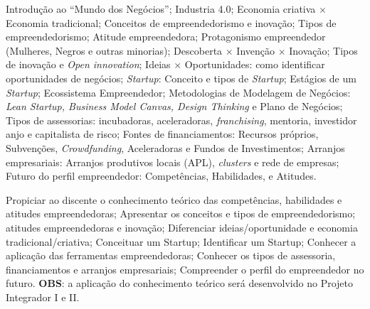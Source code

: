 \begin{pud}
	
	
	\ementa
	Introdução ao ``Mundo dos Negócios''; Industria 4.0; Economia criativa $\times$ Economia tradicional; Conceitos de empreendedorismo e inovação; Tipos de empreendedorismo; Atitude empreendedora; Protagonismo empreendedor (Mulheres, Negros e outras minorias); Descoberta $\times$ Invenção $\times$ Inovação; Tipos de inovação e \textit{Open innovation}; Ideias $\times$ Oportunidades: como identificar oportunidades de negócios; \textit{Startup}: Conceito e tipos de \textit{Startup}; Estágios de um \textit{Startup}; Ecossistema Empreendedor; Metodologias de Modelagem de Negócios: \textit{Lean Startup, Business Model Canvas, Design Thinking} e Plano de Negócios; Tipos de assessorias: incubadoras, aceleradoras, \textit{franchising}, mentoria, investidor anjo e capitalista de risco; Fontes de financiamentos: Recursos próprios, Subvenções, \textit{Crowdfunding}, Aceleradoras e Fundos de Investimentos; Arranjos empresariais: Arranjos produtivos locais (APL), \textit{clusters} e rede de empresas; Futuro do perfil empreendedor: Competências, Habilidades, e Atitudes. 
	
	\objetivos
		Propiciar ao discente o conhecimento teórico das competências, habilidades e atitudes empreendedoras; 
		Apresentar os conceitos e tipos de empreendedorismo; atitudes empreendedoras e inovação;
		Diferenciar ideias/oportunidade e economia tradicional/criativa;
		Conceituar um Startup;
		Identificar um Startup;
		Conhecer a aplicação das ferramentas empreendedoras;
		Conhecer os tipos de assessoria, financiamentos e arranjos empresariais; 
		Compreender o perfil do empreendedor no futuro.
        \newline
        \textbf{OBS}: a aplicação do conhecimento teórico será desenvolvido no Projeto Integrador I e II.
	

\end{pud}
